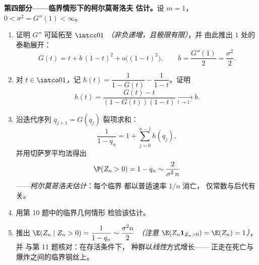 \begin{problem}
\medskip
\noindent\textbf{第四部分——临界情形下的柯尔莫哥洛夫
估计。}设 $m = 1$，$0 < \sigma^2 = G''(1) <
\infty$。
\begin{enumerate}[resume]
  \item 证明 $G''$ 可延拓至 $\intcc01$
        \emph{（非负递增，且极限有限）}，并
        由此推出 $1$ 处的泰勒展开：
        \[
        G(t) = t + b\,(1-t)^2 + o\bigl((1-t)^2\bigr),
        \qquad b = \frac{G''(1)}2 = \frac{\sigma^2}2 .
        \]
  \item 对 $t \in \intco01$，记 $h(t) = \dfrac1{1 - G(t)} -
        \dfrac1{1 - t}$。证明
        \[
        h(t) = \frac{G(t) - t}{(1 - G(t))(1 - t)}
        \xrightarrow[t\to1^-]{} b .
        \]
  \item 沿迭代序列 $q_{j+1} = G(q_j)$ 裂项求和：
        \[
        \frac1{1 - q_n} = 1 + \sum_{j=0}^{n-1}h(q_j),
        \]
        并用切萨罗平均法得出
        \[
        \P(Z_n > 0) = 1 - q_n \sim \frac{2}{\sigma^2\,n}
        \]
——\emph{柯尔莫哥洛夫估计}：每个临界
        都以普适速率 $1/n$ 消亡，
        仅常数与后代有关。
  \item 用第 10 题中的临界几何情形
        检验该估计。
  \item 推出 $\E(Z_n \mid Z_n > 0) = \dfrac{1}{1 - q_n}
        \sim \dfrac{\sigma^2 n}{2}$ \emph{（注意 $\E(Z_n
        \mathbf 1_{Z_n>0}) = \E(Z_n) = 1$）}，并
        与第 11 题核对：在存活条件下，
        种群以\emph{线性}方式增长——
        正走在死亡与爆炸之间的临界钢丝上。
\end{enumerate}


\end{problem}
